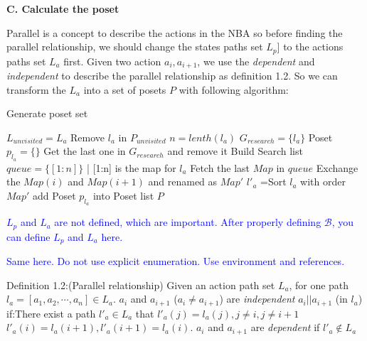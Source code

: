 \documentclass{article}
\newcommand{\blue}[1]{\textcolor{blue}{#1}}
\begin{document}
    \textbf{C. Calculate the poset}
    
    Parallel is a concept to describe the actions in the NBA so before finding the parallel relationship, we should change the states paths set $L_p]$ to the actions paths set $L_a$ first. Given two action $a_i,a_{i+1} $, we use the \emph{dependent} and \emph{independent} to describe the parallel relationship as definition 1.2. So we can transform the $L_a$ into a set of posets $P$ with following algorithm:
    
	
\begin{algorithm}
	
	\caption{Generate poset set}\label{algorithm}
	$L_{unvisited}=L_a$ \;
	{
		{
			Remove $l_a$ in  $P_{unvisited}$\;
			$n=lenth(l_a)$\;
			$G_{research}=\{ l_a \}$\;
			Poset $p_{l_a}=\{\}$\;
			{
			  Get the last one in $G_{research}$ and remove it\;
			  Build Search list $queue=\{[1:n]\}$ | [1:n] is the map for $l_a$\;
			  {
			  	Fetch the last $Map$ in $queue$\;
			  {
			  	Exchange the $Map(i)$ and $Map(i+1)$ and renamed as $Map'$ \;
			  	$l'_a$ =Sort $l_a$ with order $Map'$\;
			  }
		  }
		}
	add Poset $p_{l_a}$ into Poset list $P$
		 }
	}
	
\end{algorithm}
    

    \blue{$L_p$ and $L_a$ are not defined, which are important. After properly defining $\mathcal{B}$, you can define $L_p$ and $L_a$ here.}

\blue{Same here. Do not use explicit enumeration. Use environment and references.}


    Definition 1.2:(Parallel relationship) Given an action path set $L_a$, for one path $l_a=[ a_1,a_2,\cdots,a_n ]\in L_a$.
     $a_i$ and $a_{i+1}$ ($a_i\ne a_{i+1}$) are \emph{independent}  $a_i||a_{i+1}$ (in $l_a$) if:There exist a path  $l'_a\in L_a$ that $l'_a(j)=l_a(j),j\ne i,j\ne i+1$ $l'_a(i)=l_a(i+1),l'_a(i+1)=l_a(i)$.
    $a_i$ and $a_{i+1}$ are \emph{dependent} if $l'_a\notin L_a$
\end{document}
